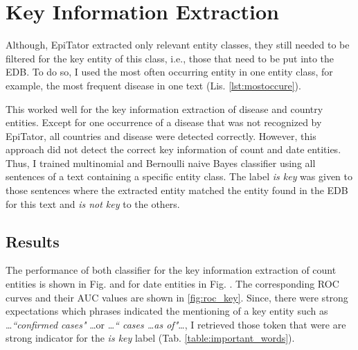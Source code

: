 \section{Key Information Extraction}
  Although, EpiTator extracted only relevant entity classes, they still needed to be filtered for the key entity of this class, i.e., those that need to be put into the EDB.
  To do so, I used the most often occurring entity in one entity class, for example, the most frequent disease in one text (Lis. \ref{lst:mostoccure}).

  This worked well for the key information extraction of disease and country entities. Except for one occurrence of a disease that was not recognized by EpiTator, all countries and disease were detected correctly. However, this approach did not detect the correct key information of count and date entities.
  Thus, I trained multinomial and Bernoulli naive Bayes classifier using all sentences of a text containing a specific entity class. The label \emph{is key} was given to those sentences where the extracted entity matched the entity found in the EDB for this text and \emph{is not key} to the others.

\subsection{Results}
  The performance of both classifier for the key information extraction of count entities is shown in Fig. \label{table:keyword_performance_counts} and for date entities in Fig. \label{table:keyword_performance_dates}. The corresponding ROC curves and their AUC values are shown in \ref{fig:roc_key}. Since, there were strong expectations which phrases indicated the mentioning of a key entity such as \dots \textit{``confirmed cases"} \dots or \dots \textit{`` cases \dots as of"}\dots, I retrieved those token that were are strong indicator for the \emph{is key} label (Tab. \ref{table:important_words}).

